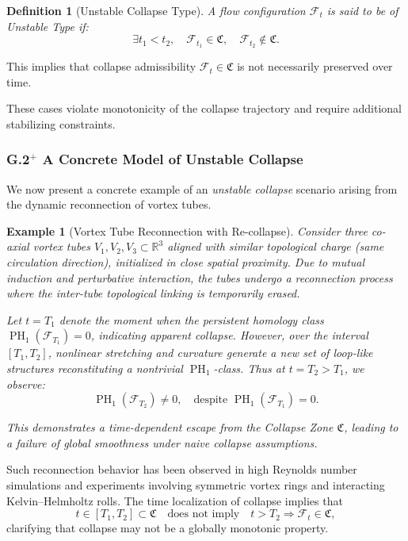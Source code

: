 \documentclass[11pt]{article}
\newtheorem{definition}[theorem]{Definition}
\newtheorem{example}[theorem]{Example}
\DeclareMathOperator{\PH}{PH}
\begin{document}
\begin{definition}[Unstable Collapse Type]
A flow configuration $\mathcal{F}_t$ is said to be of \emph{Unstable Type} if:
\[
\exists t_1 < t_2,\quad \mathcal{F}_{t_1} \in \mathfrak{C}, \quad \mathcal{F}_{t_2} \notin \mathfrak{C}.
\]
\end{definition}

This implies that collapse admissibility \( \mathcal{F}_t \in \mathfrak{C} \) is not necessarily preserved over time.

These cases violate monotonicity of the collapse trajectory and require additional stabilizing constraints.

\subsubsection{G.2$^{+}$ A Concrete Model of Unstable Collapse}

We now present a concrete example of an \emph{unstable collapse} scenario arising from the dynamic reconnection of vortex tubes.

\begin{example}[Vortex Tube Reconnection with Re-collapse]
Consider three co-axial vortex tubes \( V_1, V_2, V_3 \subset \mathbb{R}^3 \) aligned with similar topological charge (same circulation direction), initialized in close spatial proximity. Due to mutual induction and perturbative interaction, the tubes undergo a reconnection process where the inter-tube topological linking is temporarily erased.

Let \( t = T_1 \) denote the moment when the persistent homology class \(\PH_1(\mathcal{F}_{T_1}) = 0\), indicating apparent collapse. However, over the interval \( [T_1, T_2] \), nonlinear stretching and curvature generate a new set of loop-like structures reconstituting a nontrivial \(\PH_1\)-class. Thus at \( t = T_2 > T_1 \), we observe:
\[
\PH_1(\mathcal{F}_{T_2}) \neq 0, \quad \text{despite } \PH_1(\mathcal{F}_{T_1}) = 0.
\]

This demonstrates a time-dependent escape from the Collapse Zone \( \mathfrak{C} \), leading to a failure of global smoothness under naive collapse assumptions.
\end{example}

Such reconnection behavior has been observed in high Reynolds number simulations and experiments involving symmetric vortex rings and interacting Kelvin–Helmholtz rolls. The time localization of collapse implies that
\[
t \in [T_1, T_2] \subset \mathfrak{C} \quad \text{does not imply} \quad t > T_2 \Rightarrow \mathcal{F}_t \in \mathfrak{C},
\]
clarifying that collapse may not be a globally monotonic property.
\end{document}
